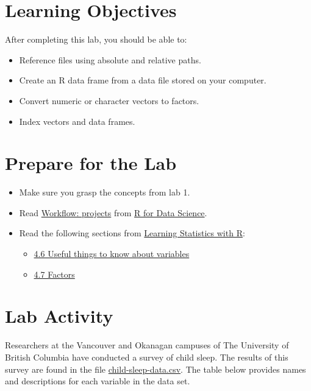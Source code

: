 \documentclass[
]{book}
\providecommand{\tightlist}{%
  \setlength{\itemsep}{0pt}\setlength{\parskip}{0pt}}
\begin{document}
\hypertarget{learning-objectives-1}{%
\section{Learning Objectives}\label{learning-objectives-1}}

After completing this lab, you should be able to:

\begin{itemize}
\tightlist
\item
  Reference files using absolute and relative paths.
\item
  Create an R data frame from a data file stored on your computer.
\item
  Convert numeric or character vectors to factors.
\item
  Index vectors and data frames.
\end{itemize}

\hypertarget{prepare-for-the-lab-1}{%
\section{Prepare for the Lab}\label{prepare-for-the-lab-1}}

\begin{itemize}
\tightlist
\item
  Make sure you grasp the concepts from lab 1.
\item
  Read \href{https://r4ds.had.co.nz/workflow-projects.html}{Workflow: projects} from \href{https://r4ds.had.co.nz/}{R for Data Science}.
\item
  Read the following sections from \href{https://learningstatisticswithr.com/}{Learning Statistics with R}:

  \begin{itemize}
  \tightlist
  \item
    \href{https://learningstatisticswithr.com/book/mechanics.html\#useful}{4.6 Useful things to know about variables}
  \item
    \href{https://learningstatisticswithr.com/book/mechanics.html\#factors}{4.7 Factors}
  \end{itemize}
\end{itemize}

\hypertarget{lab-activity-1}{%
\section{Lab Activity}\label{lab-activity-1}}

Researchers at the Vancouver and Okanagan campuses of The University of British Columbia have conducted a survey of child sleep. The results of this survey are found in the file \href{assets/data/child-sleep-data.csv}{child-sleep-data.csv}. The table below provides names and descriptions for each variable in the data set.
\end{document}

